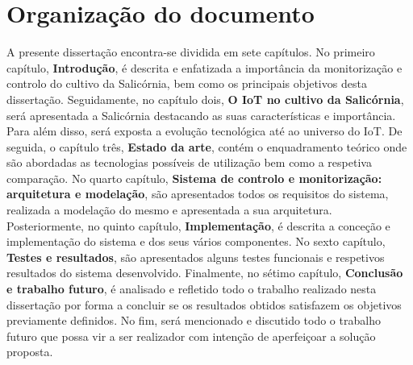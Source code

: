 \section{Organização do documento}


A presente dissertação encontra-se dividida em sete capítulos. No primeiro capítulo, \textbf{Introdução}, é descrita e enfatizada a importância da monitorização e controlo do cultivo da Salicórnia, bem como os principais objetivos desta dissertação. Seguidamente, no capítulo dois, \textbf{O \ac{IoT} no cultivo da Salicórnia}, será apresentada a Salicórnia destacando as suas características e importância. Para além disso, será  
exposta a evolução tecnológica até ao universo do \ac{IoT}. De seguida, o capítulo três, \textbf{Estado da arte}, contém o enquadramento teórico onde são abordadas as tecnologias possíveis de utilização bem como a respetiva comparação. No quarto capítulo, \textbf{Sistema de controlo e monitorização: arquitetura e modelação}, são apresentados todos os requisitos do sistema, realizada a modelação do mesmo e apresentada a sua arquitetura. Posteriormente, no quinto capítulo, \textbf{Implementação}, é descrita a conceção e implementação do sistema e dos seus vários componentes. No sexto capítulo,\textbf{ Testes e resultados}, são apresentados alguns testes funcionais e respetivos resultados do sistema desenvolvido. Finalmente, no sétimo capítulo, \textbf{Conclusão e trabalho futuro}, é analisado e refletido todo o trabalho realizado nesta dissertação por forma a concluir se os resultados obtidos satisfazem os objetivos previamente definidos. No fim, será mencionado e discutido todo o trabalho futuro que possa vir a ser realizador com intenção de aperfeiçoar a solução proposta. 



























